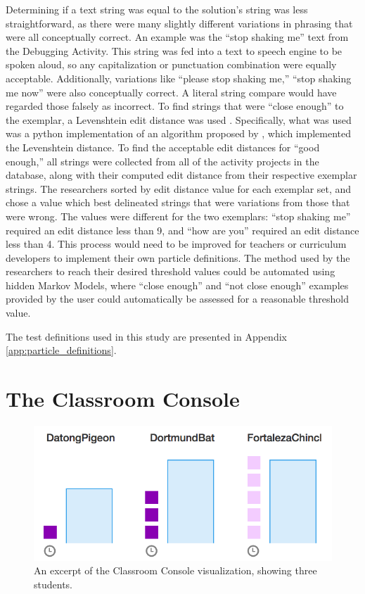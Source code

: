 \label{sec:close-enough-text} %
Determining if a text string was equal to the solution's string was less straightforward, as there were many slightly different variations in phrasing that were all conceptually correct. An example was the ``stop shaking me'' text from the Debugging Activity. This string was fed into a text to speech engine to be spoken aloud, so any capitalization or punctuation combination were equally acceptable. Additionally, variations like ``please stop shaking me,'' ``stop shaking me now'' were also conceptually correct. A literal string compare would have regarded those falsely as incorrect. To find strings that were ``close enough'' to the exemplar, a Levenshtein edit distance was used \citep{levenshtein1966binary}. Specifically, what was used was a python implementation of an algorithm proposed by \citet{hyyro2001explaining}, which implemented the Levenshtein distance. To find the acceptable edit distances for ``good enough,'' all strings were collected from all of the activity projects in the database, along with their computed edit distance from their respective exemplar strings. The researchers sorted by edit distance value for each exemplar set, and chose a value which best delineated strings that were variations from those that were wrong. The values were different for the two exemplars: ``stop shaking me'' required an edit distance less than 9, and ``how are you'' required an edit distance less than 4. This process would need to be improved for teachers or curriculum developers to implement their own particle definitions. The method used by the researchers to reach their desired threshold values could be automated using hidden Markov Models, where ``close enough'' and ``not close enough'' examples provided by the user could automatically be assessed for a reasonable threshold value.

The test definitions used in this study are presented in Appendix \ref{app:particle_definitions}. 

\section{The Classroom Console}
\label{sec:classroom-console}

\begin{figure}
  \centering
      \includegraphics{images/ch4-console-demo}
  \caption[Excerpt of the Classroom Console]{An excerpt of the Classroom Console visualization, showing three students.}
  \label{fig:console-demo}
\end{figure}


